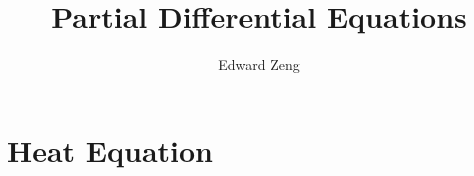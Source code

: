 
\title{Partial Differential Equations}
\author{Edward Zeng}


    \maketitle
    \tableofcontents
    \newpage
    \pagestyle{fancy}
    
    
    \section{Heat Equation}
    
    
    
    


